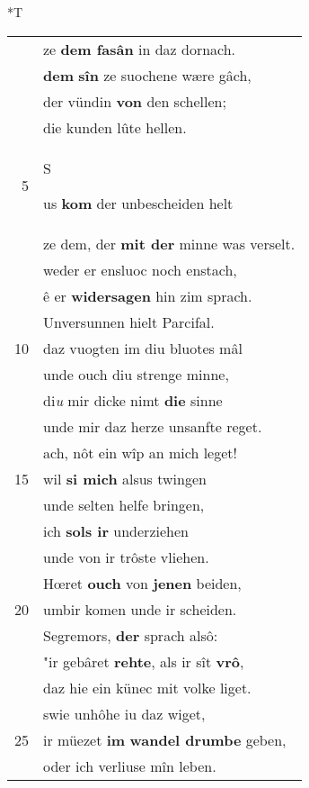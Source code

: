 \documentclass[8pt,a4paper,notitlepage]{article}
\begin{document}
\begin{table}[ht]
\begin{minipage}[t]{0.5\linewidth}
\end{minipage}
\hspace{0.5cm}
\begin{minipage}[t]{0.5\linewidth}
\small
\begin{center}*T
\end{center}
\begin{tabular}{rl}
 & ze \textbf{dem fasân} in daz dornach.\\ 
 & \textbf{dem} \textbf{sîn} ze suochene wære gâch,\\ 
 & der vündin \textbf{von} den schellen;\\ 
 & die kunden lûte hellen.\\ 
5 & \begin{large}S\end{large}us \textbf{kom} der unbescheiden helt\\ 
 & ze dem, der \textbf{mit der} minne was verselt.\\ 
 & weder er ensluoc noch enstach,\\ 
 & ê er \textbf{widersagen} hin zim sprach.\\ 
 & Unversunnen hielt Parcifal.\\ 
10 & daz vuogten im diu bluotes mâl\\ 
 & unde ouch diu strenge minne,\\ 
 & di\textit{u} mir dicke nimt \textbf{die} sinne\\ 
 & unde mir daz herze unsanfte reget.\\ 
 & ach, nôt ein wîp an mich leget!\\ 
15 & wil \textbf{si mich} alsus twingen\\ 
 & unde selten helfe bringen,\\ 
 & ich \textbf{sol}\textbf{s ir} underziehen\\ 
 & unde von ir trôste vliehen.\\ 
 & Hœret \textbf{ouch} von \textbf{jenen} beiden,\\ 
20 & umbir komen unde ir scheiden.\\ 
 & Segremors, \textbf{der} sprach alsô:\\ 
 & "ir gebâret \textbf{rehte}, als ir sît \textbf{vrô},\\ 
 & daz hie ein künec mit volke liget.\\ 
 & swie unhôhe iu daz wiget,\\ 
25 & ir müezet \textbf{im} \textbf{wandel drumbe} geben,\\ 
 & oder ich verliuse mîn leben.\\ 

\end{tabular}
\end{minipage}
\end{table}
\end{document}
